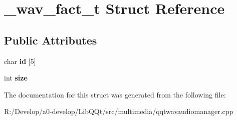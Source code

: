 \hypertarget{struct__wav__fact__t}{}\section{\+\_\+wav\+\_\+fact\+\_\+t Struct Reference}
\label{struct__wav__fact__t}
\subsection*{Public Attributes}
\begin{DoxyCompactItemize}
\item 
\mbox{\label{struct__wav__fact__t_a8976ee057a5bb491453383085dcf1c5f}} 
char {\bfseries id} \mbox{[}5\mbox{]}
\item 
\mbox{\label{struct__wav__fact__t_abff0a1ae65b31035c93735eda613f636}} 
int {\bfseries size}
\end{DoxyCompactItemize}


The documentation for this struct was generated from the following file\+:\begin{DoxyCompactItemize}
\item 
R\+:/\+Develop/a0-\/develop/\+Lib\+Q\+Qt/src/multimedia/qqtwavaudiomanager.\+cpp\end{DoxyCompactItemize}
